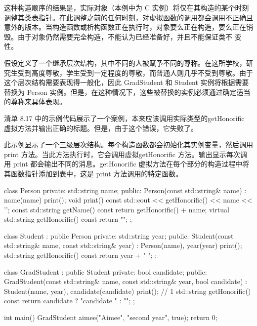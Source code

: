 
这种构造顺序的结果是，实际对象（本例中为 C 实例）将仅在其构造的某个时刻调整其类表指针。在此调整之前的任何时刻，对虚拟函数的调用都会调用不正确且意外的版本。当构造函数或析构函数正在执行时，对象要么正在构造，要么正在销毁。由于对象仍然需要完全构造，不能认为已经准备好，并且不能保证类不 变性。


假设定义了一个继承层次结构，其中不同的人被赋予不同的尊称。在这所学校，研究生受到高度尊敬，学生受到一定程度的尊敬，而普通人则几乎不受到尊敬。由于这个层次结构需要表现得一般化，因此 GradStudent 和 Student 实例将根据需要替换为 Person 实例。但是，在这种情况下，这些被替换的实例必须通过确定适当的尊称来具体表现。

清单 8.17 中的示例代码展示了一个案例，本来应该调用实际类型的getHonorific 虚拟方法并输出正确的标题。但是，由于这个错误，它失败了。

此示例显示了一个三级层次结构。每个构造函数都会初始化其实例变量，然后调用 print 方法。当此方法执行时，它会调用虚拟getHonorific 方法。输出显示每次调用 print 都会输出不同的消息。getHonorific 虚拟方法在每个部分的构造过程中将其函数指针添加到表中，这是 print 方法调用的特定函数。


\begin{cpp}
class Person {
private:
  std::string name;
public:
  Person(const std::string& name) :
  name(name) { print(); }
  void print() const { std::cout << getHonorific() << name << '\n'; }
  const std::string getName() const { return getHonorific() + name; }
  virtual std::string getHonorific() const { return ""; }
};

class Student : public Person {
private:
  std::string year;
public:
  Student(const std::string& name, const std::string& year) : Person(name),
    year(year) { print(); }
  std::string getHonorific() const { return year + " "; }
};

class GradStudent : public Student {
private:
  bool candidate;
public:
  GradStudent(const std::string& name, const std::string& year,
    bool candidate) : Student(name, year), candidate(candidate)
  { print(); } // 1
  std::string getHonorific() const {
    return candidate ? "candidate " : "";
  }
};

int main() {
  GradStudent aimee("Aimee", "second year", true);
  return 0;
}
\end{cpp}


